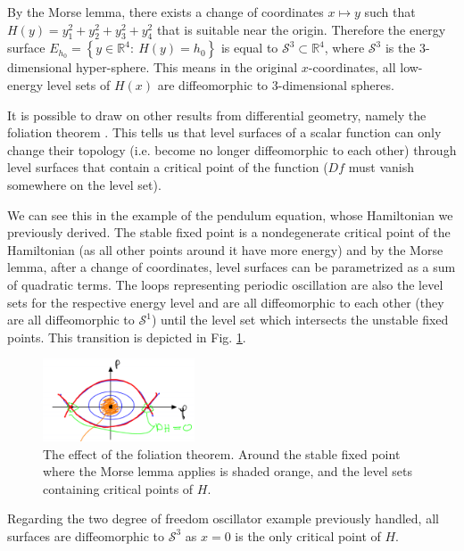 \begin{ex}
By the Morse lemma, there exists a change of coordinates $x\mapsto y$ such that $H(y) = y_{1}^{2} + y_{2}^{2} + y_{3}^{2}+y_{4}^{2}$ that is suitable near the origin. Therefore the energy surface $E_{h_0} = \left\{ y \in \mathbb{R}^{4}:\ H(y) = h_0\right\}$ is equal to $\mathcal{S}^3 \subset \mathbb{R}^{4}$, where $\mathcal{S}^{3}$ is the 3-dimensional hyper-sphere. This means in the original $x$-coordinates, all low-energy level sets of $H(x)$ are diffeomorphic to $3$-dimensional spheres.
\end{ex}

It is possible to draw on other results from differential geometry, namely the foliation theorem \cite{Milnor1965}. This tells us that level surfaces of a scalar function can only change their topology (i.e. become no longer diffeomorphic to each other) through level surfaces that contain a critical point of the function ($Df$ must vanish somewhere on the level set). 

We can see this in the example of the pendulum equation, whose Hamiltonian we previously derived. The stable fixed point is a nondegenerate critical point of the Hamiltonian (as all other points around it have more energy) and by the Morse lemma, after a change of coordinates, level surfaces can be parametrized as a sum of quadratic terms. The loops representing periodic oscillation are also the level sets for the respective energy level and are all diffeomorphic to each other (they are all diffeomorphic to $\mathcal{S}^{1}$) until the level set which intersects the unstable fixed points. This transition is depicted in Fig. \ref{fig:morse_foliation}.

\begin{figure}[h!]
	\centering
	\includegraphics[width=0.4\textwidth]{figures/ch8/5morse_foliation.png}
	\caption{The effect of the foliation theorem. Around the stable fixed point where the Morse lemma applies is shaded orange, and the level sets containing critical points of $H$.}
	\label{fig:morse_foliation}
\end{figure}

Regarding the two degree of freedom oscillator example previously handled, all surfaces are diffeomorphic to $\mathcal{S}^{3}$ as $x=0$ is the only critical point of $H$.

